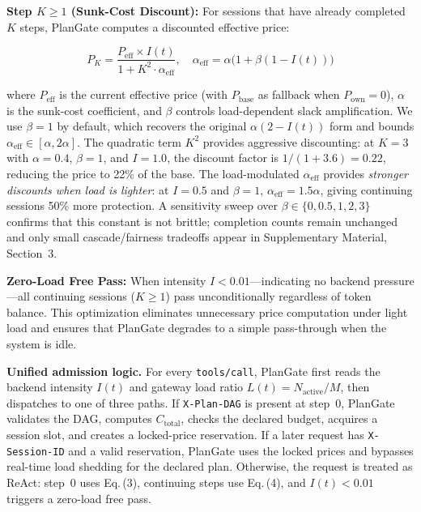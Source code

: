\documentclass[sigconf,review,anonymous]{acmart}
\begin{document}
\textbf{Step $K \geq 1$ (Sunk-Cost Discount):} For sessions that have already completed $K$ steps, PlanGate computes a discounted effective price:

\begin{equation}
\label{eq:sunkcost}
P_K = \frac{P_{\text{eff}} \times I(t)}
{1 + K^2 \cdot \alpha_{\text{eff}}}, 
\quad 
\alpha_{\text{eff}} = \alpha \bigl(1+\beta(1-I(t))\bigr)
\end{equation}

\noindent where $P_{\text{eff}}$ is the current effective price (with $P_{\text{base}}$ as fallback when $P_{\text{own}} = 0$), $\alpha$ is the sunk-cost coefficient, and $\beta$ controls load-dependent slack amplification. We use $\beta{=}1$ by default, which recovers the original $\alpha(2-I(t))$ form and bounds $\alpha_{\text{eff}}\in[\alpha,2\alpha]$. The quadratic term $K^2$ provides aggressive discounting: at $K=3$ with $\alpha=0.4$, $\beta=1$, and $I=1.0$, the discount factor is $1/(1+3.6)=0.22$, reducing the price to 22\% of the base. The load-modulated $\alpha_{\text{eff}}$ provides \emph{stronger discounts when load is lighter}: at $I=0.5$ and $\beta=1$, $\alpha_{\text{eff}}=1.5\alpha$, giving continuing sessions 50\% more protection. A sensitivity sweep over $\beta\in\{0,0.5,1,2,3\}$ confirms that this constant is not brittle; completion counts remain unchanged and only small cascade/fairness tradeoffs appear in Supplementary Material, Section~3.


\textbf{Zero-Load Free Pass:} When intensity $I < 0.01$---indicating no backend pressure---all continuing sessions ($K \geq 1$) pass unconditionally regardless of token balance. This optimization eliminates unnecessary price computation under light load and ensures that PlanGate degrades to a simple pass-through when the system is idle.


\textbf{Unified admission logic.}
For every \texttt{tools/call}, PlanGate first reads the backend intensity $I(t)$ and gateway load ratio $L(t)=N_{\text{active}}/M$, then dispatches to one of three paths. If \texttt{X-Plan-DAG} is present at step~0, PlanGate validates the DAG, computes $C_{\text{total}}$, checks the declared budget, acquires a session slot, and creates a locked-price reservation. If a later request has \texttt{X-Session-ID} and a valid reservation, PlanGate uses the locked prices and bypasses real-time load shedding for the declared plan. Otherwise, the request is treated as ReAct: step~0 uses Eq.\,(3), continuing steps use Eq.\,(4), and $I(t)<0.01$ triggers a zero-load free pass.
\end{document}
